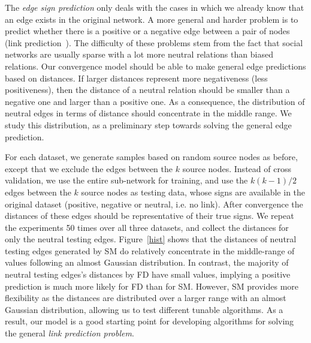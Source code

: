  The {\it edge sign
  prediction} only deals with the cases in which we already know that
an edge exists in the original network. A more general and harder
problem is to predict whether there is a positive or a negative edge
between a pair of nodes (link prediction~\cite{Kleinberg:03}). The
difficulty of these problems stem from the fact that social networks
are usually sparse with a lot more neutral relations than biased
relations. Our convergence model should be able to make general edge
predictions based on distances. If larger distances represent more
negativeness (less positiveness), then the distance of a neutral
relation should be smaller than a negative one and larger than a
positive one. As a consequence, the distribution of neutral edges in
terms of distance should concentrate in the middle range. We study
this distribution, as a preliminary step towards solving the general
edge prediction.

For each dataset, we generate samples based on random source nodes as
before, except that we exclude the edges between the $k$ source
nodes. Instead of cross validation, we use the entire sub-network for
training, and use the $k(k-1)/2$ edges between the $k$ source nodes as
testing data, whose signs are available in the original dataset
(positive, negative or neutral, i.e. no link). %
After convergence the distances of these edges should be
representative of their true signs. We repeat the experiments 50 times
over all three datasets, and collect the distances for only the
neutral testing edges. Figure~\ref{hist} shows that the distances of
neutral testing edges generated by SM do relatively concentrate in the
middle-range of values following an almost Gaussian distribution. In
contrast, the majority of neutral testing edges's distances by FD have
small values, implying a positive prediction is much more likely for
FD than for SM.  However, SM provides more flexibility as the
distances are distributed over a larger range with an almost Gaussian
distribution, allowing us to test different tunable algorithms.
As a result, our model
is a good starting point for developing algorithms for solving the general
{\it link prediction problem}.
